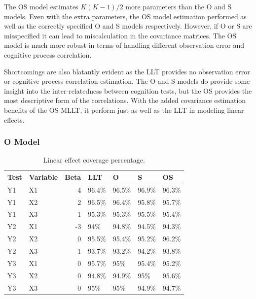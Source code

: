 \documentclass[
]{article}
\begin{document}
The OS model estimates \(K(K-1)/2\) more parameters than the O and S models. Even with the extra parameters, the OS model estimation performed as well as the correctly specified O and S models respectively. However, if O or S are misspecified it can lead to miscalculation in the covariance matrices. The OS model is much more robust in terms of handling different observation error and cognitive process correlation.

Shortcomings are also blatantly evident as the LLT provides no observation error or cognitive process correlation estimation. The O and S models do provide some insight into the inter-relatedness between cognition tests, but the OS provides the most descriptive form of the correlations. With the added covariance estimation benefits of the OS MLLT, it perform just as well as the LLT in modeling linear effects.

\hypertarget{o-model-1}{%
\subsubsection{O Model}\label{o-model-1}}

\begin{table}

\caption{\label{tab:unnamed-chunk-21}Linear effect coverage percentage.}
\centering
\begin{tabular}[t]{llrllll}
\toprule
Test & Variable & Beta & LLT & O & S & OS\\
\midrule
Y1 & X1 & 4 & 96.4\% & 96.5\% & 96.9\% & 96.3\%\\
Y1 & X2 & 2 & 96.5\% & 96.4\% & 95.8\% & 95.7\%\\
Y1 & X3 & 1 & 95.3\% & 95.3\% & 95.5\% & 95.4\%\\
Y2 & X1 & -3 & 94\% & 94.8\% & 94.5\% & 94.3\%\\
Y2 & X2 & 0 & 95.5\% & 95.4\% & 95.2\% & 96.2\%\\
\addlinespace
Y2 & X3 & 1 & 93.7\% & 93.2\% & 94.2\% & 93.8\%\\
Y3 & X1 & 0 & 95.7\% & 95\% & 95.4\% & 95.2\%\\
Y3 & X2 & 0 & 94.8\% & 94.9\% & 95\% & 95.6\%\\
Y3 & X3 & 0 & 95\% & 95\% & 94.9\% & 94.7\%\\
\bottomrule
\end{tabular}
\end{table}
\end{document}
